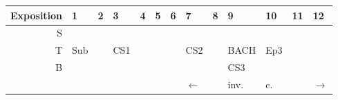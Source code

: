 \documentclass[11pt]{article}
\author{Francisco Kim}
\date{\today}
\title{}
\begin{document}
\thispagestyle{empty}
\nopagecolor

\begin{center}
\begin{tabular}{r|llllllllllll}
Exposition & 1 & 2 & 3 & 4 & 5 & 6 & 7 & 8 & 9 & 10 & 11 & 12\\
\hline
S &  &  &  &  &  &  & \phantom{Sub}\cellcolor{red!30} & \phantom{Sub}\cellcolor{red!30} & \phantom{Sub}\cellcolor{blue!30} & \phantom{Sub}\cellcolor{orange!10} & \phantom{Sub}\cellcolor{orange!10} & \phantom{Sub}\cellcolor{orange!10}\\
T & Sub\cellcolor{red!30} & \phantom{Sub}\cellcolor{red!30} & CS1\cellcolor{blue!30} & \phantom{Sub}\cellcolor{blue!30} & \phantom{Sub}\cellcolor{gray!30} & \phantom{Sub}\cellcolor{gray!30} & CS2\cellcolor{yellow!30} & \phantom{Sub}\cellcolor{yellow!30} & \tiny{BACH}\cellcolor{red!50} & \color{gray!90}Ep3\cellcolor{orange!25} & \phantom{Sub}\cellcolor{orange!25} & \phantom{Sub}\cellcolor{orange!10}\\
B &  &  & \phantom{Sub}\cellcolor{red!30} & \phantom{Sub}\cellcolor{red!30} & \phantom{Sub}\cellcolor{gray!30} & \phantom{Sub}\cellcolor{gray!30} & \phantom{Sub}\cellcolor{blue!30} & \phantom{Sub}\cellcolor{blue!30} & CS3\cellcolor{green!30} & \phantom{Sub}\cellcolor{orange!40} & \phantom{Sub}\cellcolor{orange!40} & \\
 &  &  &  &  &  &  & \(\longleftarrow\) &  & inv. & c. &  & \(\longrightarrow\)\\
\end{tabular}
\end{center}
\end{document}
